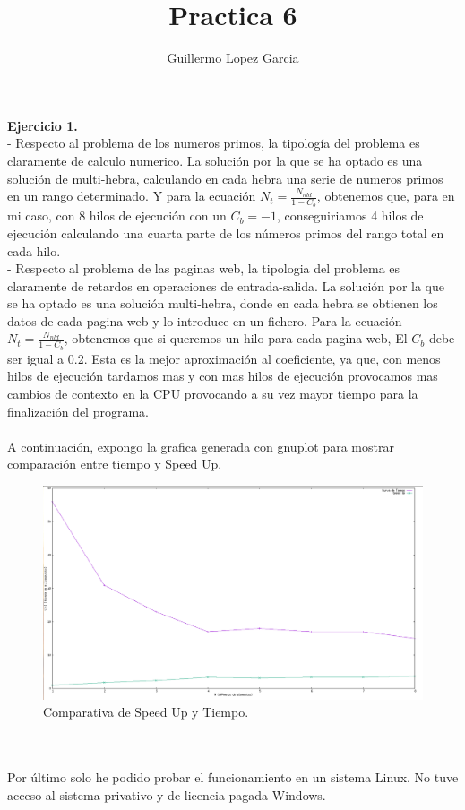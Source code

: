 \documentclass{minimal}
\title{Practica 6}
\author{Guillermo Lopez Garcia}
\begin{document}
\maketitle

\textbf{Ejercicio 1.} \\
- Respecto al problema de los numeros primos, la tipología del problema es claramente de calculo numerico. La solución por la que
se ha optado es una solución de multi-hebra, calculando en cada hebra una serie de numeros primos en un rango determinado. Y para 
la ecuación $N_{t} = \frac{N_{nld}}{1-C_{b}}$, obtenemos que, para en mi caso, con 8 hilos de ejecución con un $C_{b}=-1$, conseguiriamos
4 hilos de ejecución calculando una cuarta parte de los números primos del rango total en cada hilo.\\

- Respecto al problema de las paginas web, la tipologia del problema es claramente de retardos en operaciones de entrada-salida. La
solución por la que se ha optado es una solución multi-hebra, donde en cada hebra se obtienen los datos de cada pagina web y lo introduce
en un fichero. Para la ecuación $N_{t} = \frac{N_{nld}}{1-C_{b}}$, obtenemos que si queremos un hilo para cada pagina web, El $C_{b}$ debe ser
igual a 0.2. Esta es la mejor aproximación al coeficiente, ya que, con menos hilos de ejecución tardamos mas y con mas hilos de ejecución
provocamos mas cambios de contexto en la CPU provocando a su vez mayor tiempo para la finalización del programa.\\
\\


A continuación, expongo la grafica generada con gnuplot para mostrar comparación entre 
tiempo y Speed Up.
\\
\begin{figure}
  \includegraphics[width=\linewidth]{img.png}
  \caption{Comparativa de Speed Up y Tiempo.}
\label{fig:comp}
\end{figure}
\\
\\
Por último solo he podido probar el funcionamiento en un sistema Linux. No tuve acceso al sistema privativo y de licencia pagada Windows.
\end{document}

